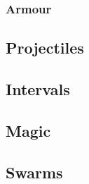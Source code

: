 \documentclass[a4paper,openany]{book}
\begin{document}
\begin{multicols}{2}
\subsubsection*{Armour}



\commonArmourChart

\mentalSkillChart

\subsection*{Projectiles}



\subsection*{Intervals}



\subsection*{Magic}



\subsection*{Swarms}



\end{multicols}
\end{document}
